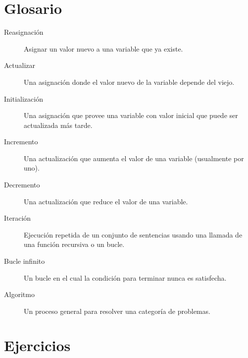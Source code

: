 \section{Glosario}

\begin{description}

\item[Reasignación] Asignar un valor nuevo a una variable que ya existe.

\item[Actualizar] Una asignación donde el valor nuevo de la variable depende
del viejo.

\item[Initialización] Una asignación que provee una variable con valor
inicial que puede ser actualizada más tarde.

\item[Incremento] Una actualización que aumenta el valor de una 
variable (usualmente por uno).

\item[Decremento] Una actualización que reduce el valor de una variable.

\item[Iteración] Ejecución repetida de un conjunto de sentencias usando
una llamada de una función recursiva o un bucle.

\item[Bucle infinito] Un bucle en el cual la condición para terminar
nunca es satisfecha.

\item[Algoritmo]  Un proceso general para resolver una categoría de problemas.

\end{description}


\section{Ejercicios}

